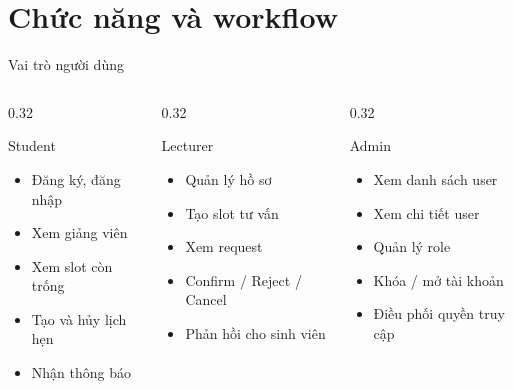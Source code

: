 \documentclass[aspectratio=169,11pt]{beamer}
\begin{document}
\section{Chức năng và workflow}

\begin{frame}{Vai trò người dùng}
  \begin{columns}[T]
    \begin{column}{0.32\textwidth}
      \begin{block}{Student}
        \begin{itemize}
          \item Đăng ký, đăng nhập
          \item Xem giảng viên
          \item Xem slot còn trống
          \item Tạo và hủy lịch hẹn
          \item Nhận thông báo
        \end{itemize}
      \end{block}
    \end{column}
    \begin{column}{0.32\textwidth}
      \begin{block}{Lecturer}
        \begin{itemize}
          \item Quản lý hồ sơ
          \item Tạo slot tư vấn
          \item Xem request
          \item Confirm / Reject / Cancel
          \item Phản hồi cho sinh viên
        \end{itemize}
      \end{block}
    \end{column}
    \begin{column}{0.32\textwidth}
      \begin{block}{Admin}
        \begin{itemize}
          \item Xem danh sách user
          \item Xem chi tiết user
          \item Quản lý role
          \item Khóa / mở tài khoản
          \item Điều phối quyền truy cập
        \end{itemize}
      \end{block}
    \end{column}
  \end{columns}
\end{frame}
\end{document}
